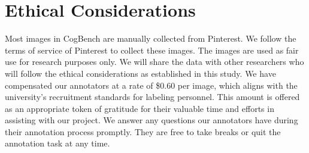 












\section{Ethical Considerations}
\label{sec:ethical}

Most images in CogBench are manually collected from Pinterest. 
We follow the terms of service of Pinterest to collect these images.
The images are used as fair use for research purposes only.
We will share the data with other researchers who will follow the ethical considerations as established in this study.
We have compensated our annotators at a rate of \$0.60 per image, which aligns with the university's recruitment standards for labeling personnel. This amount is offered as an appropriate token of gratitude for their valuable time and efforts in assisting with our project.
We answer any questions our annotators have during their annotation process promptly. 
They are free to take breaks or quit the annotation task at any time.